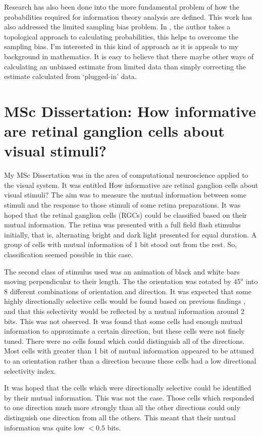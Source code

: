 \documentclass[a4paper,12pt]{article}
\theoremstyle{definition}
\begin{document}
 Research has also been done into the more fundamental problem of how the probabilities required for information theory analysis are defined. This work has also addressed the limited sampling bias problem. In \cite{calculating}, the author takes a topological approach to calculating probabilities, this helps to overcome the sampling bias. I’m interested in this kind of approach as it is appeals to my background in mathematics. It is easy to believe that there maybe other ways of calculating an unbiased estimate from limited data than simply correcting the estimate calculated from `plugged-in' data.

\section*{MSc Dissertation: How informative are retinal ganglion cells about
visual stimuli?}
 My MSc Dissertation was in the area of computational neuroscience applied to the visual system. It was entitled How informative are retinal ganglion cells about visual stimuli? The aim was to measure the mutual information between some stimuli and the response to those stimuli of some retina preparations. It was hoped that the retinal ganglion cells (RGCs) could be classified based on their mutual information. The retina was presented with a full field flash stimulus initially, that is, alternating bright and dark light presented for equal duration. A group of cells with mutual information of 1 bit stood out from the rest. So, classification seemed possible in this case.

 The second class of stimulus used was an animation of black and white bars moving perpendicular to their length. The the orientation was rotated by $45^{o}$ into 8 different combinations of orientation and direction. It was expected that some highly directionally selective cells would be found based on previous findings \cite{identification}, and that this selectivity would be reflected by a mutual information around 2 bits. This was not observed. It was found that some cells had enough mutual information to approximate a certain direction, but these cells were not finely tuned. There were no cells found which could distinguish all of the directions. Most cells with greater than 1 bit of mutual information appeared to be attuned to an orientation rather than a direction because these cells had a low directional selectivity index.

 It was hoped that the cells which were directionally selective could be identified by
their mutual information. This was not the case. Those cells which responded to one
direction much more strongly than all the other directions could only distinguish one
direction from all the others. This meant that their mutual information was quite low
$< 0.5$ bits.

\newpage

\end{document}
